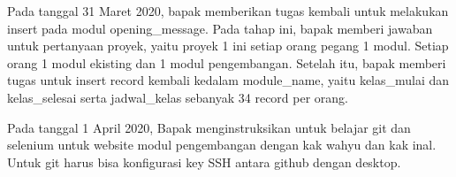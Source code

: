 \documentclass[a4paper, 12 pt]{article}
\begin{document}
		    \par Pada tanggal 31 Maret 2020, bapak memberikan tugas kembali untuk melakukan insert pada modul opening\_message. Pada tahap ini, bapak memberi jawaban untuk pertanyaan proyek, yaitu proyek 1 ini setiap orang pegang 1 modul. Setiap orang 1 modul ekisting dan 1 modul pengembangan. Setelah itu, bapak memberi tugas untuk insert record kembali kedalam module\_name, yaitu kelas\_mulai dan kelas\_selesai serta jadwal\_kelas sebanyak 34 record per orang. \linebreak
		
		    \par Pada tanggal 1 April 2020, Bapak menginstruksikan untuk belajar git dan selenium untuk website modul pengembangan dengan kak wahyu dan kak inal. Untuk git harus bisa konfigurasi key SSH antara github dengan desktop. \linebreak
		
\end{document}
